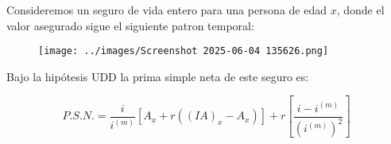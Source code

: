 \begin{theorem}
    Consideremos un seguro de vida entero para una persona de edad $x$, donde el valor asegurado sigue el siguiente patron temporal:
    
    \begin{figure}[H]
        \center
        \texttt{[image: ../images/Screenshot 2025-06-04 135626.png]}
    \end{figure}
    
    Bajo la hipótesis UDD la prima simple neta de este seguro es:

    \begin{equation}
        P.S.N. = \frac{i}{i^{(m)}}[A_x + r((IA)_x - A_x)] + r \left[\frac{i - i^{(m)}}{\left(i^{(m)}\right)^2}\right]
    \end{equation}

\end{theorem}
    
